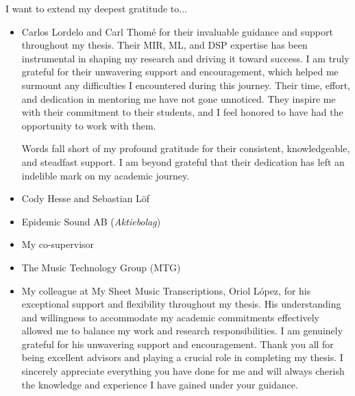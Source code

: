 

\begin{acknowledgement}

I want to extend my deepest gratitude to...

\begin{itemize}
\item Carlos Lordelo and Carl Thomé for their invaluable guidance and support throughout my thesis. Their MIR, ML, and DSP expertise has been instrumental in shaping my research and driving it toward success. I am truly grateful for their unwavering support and encouragement, which helped me surmount any difficulties I encountered during this journey. Their time, effort, and dedication in mentoring me have not gone unnoticed. They inspire me with their commitment to their students, and I feel honored to have had the opportunity to work with them.

Words fall short of my profound gratitude for their consistent, knowledgeable, and steadfast support. I am beyond grateful that their dedication has left an indelible mark on my academic journey.

\vspace*{3mm}
\item Cody Hesse and Sebastian Löf
\vspace*{3mm}
\item Epidemic Sound AB (\textit{Aktiebolag})
\vspace*{3mm}
\item My co-supervisor
\vspace*{3mm}
\item The Music Technology Group (MTG)
\vspace*{3mm}
\item My colleague at My Sheet Music Transcriptions, Oriol López, for his exceptional support and flexibility throughout my thesis. His understanding and willingness to accommodate my academic commitments effectively allowed me to balance my work and research responsibilities. I am genuinely grateful for his unwavering support and encouragement.
\vspace*{3mm}
Thank you all for being excellent advisors and playing a crucial role in completing my thesis. I sincerely appreciate everything you have done for me and will always cherish the knowledge and experience I have gained under your guidance.
\vspace*{3mm}
\end{itemize}

\newpage
\end{acknowledgement}